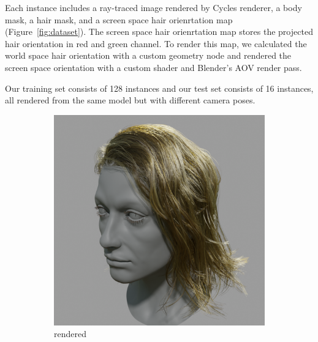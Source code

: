 \documentclass{article}
\begin{document}
Each instance includes a ray-traced image rendered by Cycles renderer, a body mask, a hair mask, and a screen space hair orienrtation map (Figure~\ref{fig:dataset}). The screen space hair orienrtation map stores the projected hair orientation in red and green channel. To render this map, we calculated the world space hair orientation with a custom geometry node and rendered the screen space orientation with a custom shader and Blender's AOV render pass.

Our training set consists of 128 instances and our test set consists of 16 instances, all rendered from the same model but with different camera poses.

\begin{figure}[h]
	\centering
	\begin{subfigure}{0.11\textwidth}
		\centering
		\includegraphics[width=\textwidth]{./images/dataset/0009_rendered.png}
		\caption{rendered}
	\end{subfigure}
	\hfill
	\begin{subfigure}{0.11\textwidth}
		\centering

\end{subfigure}
\end{figure}
\end{document}
